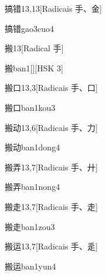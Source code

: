 \begin{entry}{搞错}{13,13}[Radicais ⼿、⾦]
  \begin{phonetics}{搞错}{gao3cuo4}
  \end{phonetics}
\end{entry}

\begin{entry}{搬}{13}[Radical ⼿]
  \begin{phonetics}{搬}{ban1}[][HSK 3]
  \end{phonetics}
\end{entry}

\begin{entry}{搬口}{13,3}[Radicais ⼿、⼝]
  \begin{phonetics}{搬口}{ban1kou3}
  \end{phonetics}
\end{entry}

\begin{entry}{搬动}{13,6}[Radicais ⼿、⼒]
  \begin{phonetics}{搬动}{ban1dong4}
  \end{phonetics}
\end{entry}

\begin{entry}{搬弄}{13,7}[Radicais ⼿、⼶]
  \begin{phonetics}{搬弄}{ban1nong4}
  \end{phonetics}
\end{entry}

\begin{entry}{搬走}{13,7}[Radicais ⼿、⾛]
  \begin{phonetics}{搬走}{ban1zou3}
  \end{phonetics}
\end{entry}

\begin{entry}{搬运}{13,7}[Radicais ⼿、⾡]
  \begin{phonetics}{搬运}{ban1yun4}
  \end{phonetics}
\end{entry}

